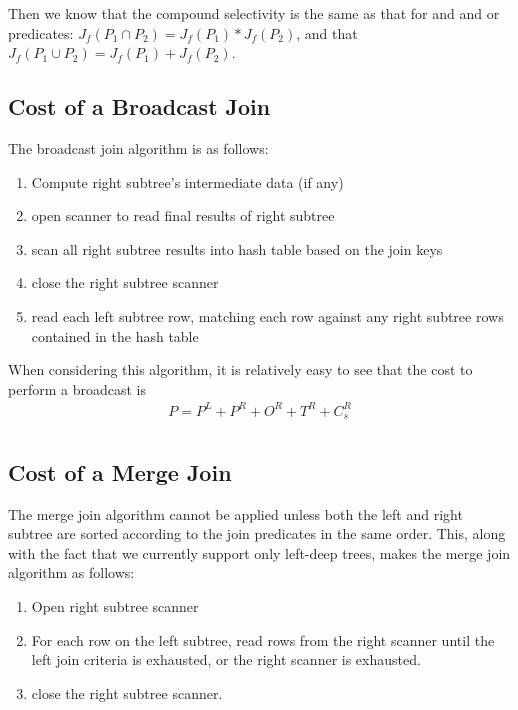 \documentclass[10pt]{amsart}
\begin{document}
Then we know that the compound selectivity is the same as that for and and or predicates: $J_f(P_1 \cap P_2) = J_f(P_1) * J_f(P_2)$, and that $J_f(P_1 \cup P_2) = J_f(P_1) + J_f(P_2)$. 

\subsection{Cost of a Broadcast Join}
The broadcast join algorithm is as follows:

\begin{enumerate}
				\item Compute right subtree's intermediate data (if any)
				\item open scanner to read final results of right subtree
				\item scan all right subtree results into hash table based on the join keys
				\item close the right subtree scanner
				\item read each left subtree row, matching each row against any right subtree rows contained in the hash table
\end{enumerate}

When considering this algorithm, it is relatively easy to see that the cost to perform a broadcast is 
\begin{equation}
				\begin{aligned}
					P = P^L + P^R+O^R+T^R+C_s^R \\
				\end{aligned}
\end{equation}

\subsection{Cost of a Merge Join}
The merge join algorithm cannot be applied unless both the left and right subtree are sorted according to the join predicates in the same order. This, along with the fact that we currently support only left-deep trees, makes the merge join algorithm as follows:

\begin{enumerate}
				\item Open right subtree scanner
				\item For each row on the left subtree, read rows from the right scanner until the left join criteria is exhausted, or the right scanner is exhausted.
				\item close the right subtree scanner.
\end{enumerate}
\end{document}
